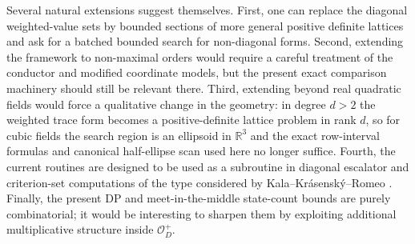 \documentclass[manuscript]{acmart}
\theoremstyle{plain}
\theoremstyle{definition}
\theoremstyle{nonitalicremark}
\newcommand{\R}{\mathbb{R}}
\newcommand{\OO}{\mathcal{O}}
\newcommand{\OD}{\OO_D}
\begin{document}
Several natural extensions suggest themselves. First, one can replace the diagonal weighted-value
sets by bounded sections of more general positive definite lattices and ask for a batched bounded
search for non-diagonal forms. Second, extending the framework to non-maximal orders would require a
careful treatment of the conductor and modified coordinate models, but the present exact comparison
machinery should still be relevant there. Third, extending beyond real quadratic fields would force a
qualitative change in the geometry: in degree $d>2$ the weighted trace form becomes a positive-definite
lattice problem in rank $d$, so for cubic fields the search region is an ellipsoid in $\R^3$ and the
exact row-interval formulas and canonical half-ellipse scan used here no longer suffice. Fourth, the
current routines are designed to be used as a subroutine in diagonal escalator and criterion-set
computations of the type considered by Kala--Kr\'asensk\'y--Romeo \cite{KKR}. Finally, the present
DP and meet-in-the-middle state-count bounds are purely combinatorial; it would be interesting to
sharpen them by exploiting additional multiplicative structure inside $\OD^+$.




\end{document}
